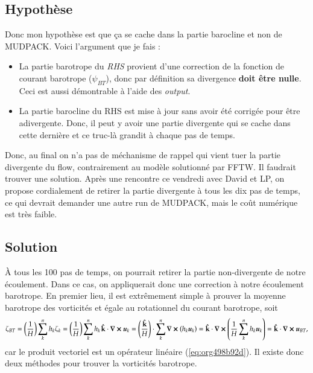 \documentclass[10pt]{article}
\numberwithin{equation}{section}
\newcommand{\kvf}{\vb{\hat{k}}}
\newcommand{\uu}{\vb*{u}}
\newcommand{\pt}{\hspace{1pt}}
\begin{document}
\subsection{Hypothèse}
\label{sec:org4706008}
Donc mon hypothèse est que ça se cache dans la partie barocline et non de MUDPACK.
Voici l'argument que je fais :
\begin{itemize}
\item La partie barotrope du \emph{RHS} provient d'une correction de la fonction de courant barotrope (\(\psi_{BT}\)), donc par définition sa divergence \textbf{doit être nulle}. Ceci est aussi démontrable à l'aide des \emph{output}.
\item La partie barocline du RHS est mise à jour sans avoir été corrigée pour être adivergente.
Donc, il peut y avoir une partie divergente qui se cache dans cette dernière et ce truc-là grandit à chaque pas de temps.
\end{itemize}

Donc, au final on n'a pas de méchanisme de rappel qui vient tuer la partie divergente du flow, contrairement au modèle solutionné par FFTW.
Il faudrait trouver une solution.
Après une rencontre ce vendredi avec David et LP, on propose cordialement de retirer la partie divergente à tous les dix pas de temps, ce qui devrait demander une autre run de MUDPACK, mais le coût numérique est très faible.

\subsection{Solution}
\label{sec:org46abf7b}

À tous les 100 pas de temps, on pourrait retirer la partie non-divergente de notre écoulement.
Dans ce cas, on appliquerait donc une correction à notre écoulement barotrope.
En premier lieu, il est extrêmement simple à prouver la moyenne barotrope des vorticités et égale au rotationnel du courant barotrope, soit
\begin{equation}
\label{eq:org498b92d}
   \zeta_{BT} = \qty(\frac{1}{H})\sum_k^n h_k\zeta_k = \qty(\frac{1}{H})\sum_k^n h_k\pt \kvf \cdot \curl{\uu_k} = \qty(\frac{ \kvf}{H})\cdot\sum_k^n\curl(h_k\uu_k) = \kvf\cdot\curl(\frac{1}{H}\sum_k^n h_k\uu_k) = \kvf\cdot\curl{\uu_{BT}},
\end{equation}
car le produit vectoriel est un opérateur linéaire (\ref{eq:org498b92d}).
Il existe donc deux méthodes pour trouver la vorticités barotrope.\bigskip
\end{document}
